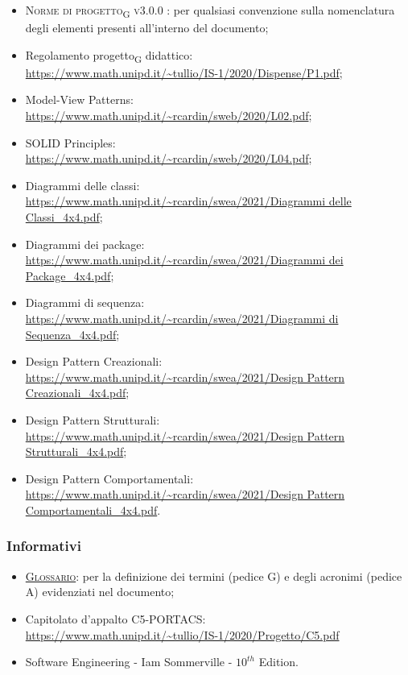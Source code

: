 \begin{itemize}
	\item \textsc{Norme di progetto\textsubscript{G} v3.0.0 }: per qualsiasi convenzione sulla nomenclatura degli elementi presenti all’interno del documento;
	
	\item Regolamento progetto\textsubscript{G} didattico: \\ {\url{https://www.math.unipd.it/~tullio/IS-1/2020/Dispense/P1.pdf}};
	\item Model-View Patterns: \\ {\url{https://www.math.unipd.it/~rcardin/sweb/2020/L02.pdf}};
	\item SOLID Principles: \\ {\url{https://www.math.unipd.it/~rcardin/sweb/2020/L04.pdf}};
	\item Diagrammi delle classi: \\ {\url{https://www.math.unipd.it/~rcardin/swea/2021/Diagrammi delle Classi_4x4.pdf}};
	\item Diagrammi dei package: \\ {\url{https://www.math.unipd.it/~rcardin/swea/2021/Diagrammi dei Package_4x4.pdf}};
	\item Diagrammi di sequenza: \\ {\url{https://www.math.unipd.it/~rcardin/swea/2021/Diagrammi di Sequenza_4x4.pdf}};
	\item Design Pattern Creazionali: \\ {\url{https://www.math.unipd.it/~rcardin/swea/2021/Design Pattern Creazionali_4x4.pdf}};
	\item Design Pattern Strutturali: \\ {\url{https://www.math.unipd.it/~rcardin/swea/2021/Design Pattern Strutturali_4x4.pdf}};
	\item Design Pattern Comportamentali: \\ {\url{https://www.math.unipd.it/~rcardin/swea/2021/Design Pattern Comportamentali_4x4.pdf}}.
\end{itemize}



\subsubsection{Informativi}
\begin{itemize}
	\item \textsc{\href{https://github.com/Three-Way-Milkshake/docs/wiki/Glossario}{Glossario}}: per la definizione dei termini (pedice G) e degli acronimi (pedice A) evidenziati nel documento;
	\item Capitolato d'appalto C5-PORTACS: \\
{\url{https://www.math.unipd.it/~tullio/IS-1/2020/Progetto/C5.pdf}}
	\item Software Engineering - Iam Sommerville - $10^{th}$ Edition.
\end{itemize}